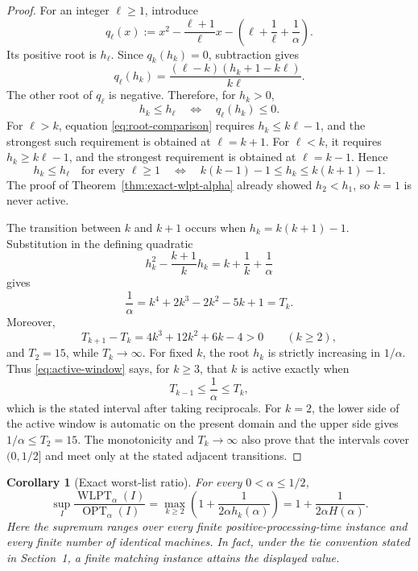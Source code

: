 \documentclass[11pt]{article}
\newtheorem{corollary}[theorem]{Corollary}
\theoremstyle{remark}
\newcommand{\OPT}{\operatorname{OPT}}
\newcommand{\WLPT}{\operatorname{WLPT}}
\begin{document}
\begin{proof}
For an integer $\ell\geq1$, introduce
\[
 q_\ell(x):=
 x^2-\frac{\ell+1}{\ell}x
 -\left(\ell+\frac1\ell+\frac1\alpha\right).
\]
Its positive root is $h_\ell$.  Since $q_k(h_k)=0$, subtraction gives
\begin{equation}
 q_\ell(h_k)
 =\frac{(\ell-k)(h_k+1-k\ell)}{k\ell}.
 \label{eq:root-comparison}
\end{equation}
The other root of $q_\ell$ is negative.  Therefore, for $h_k>0$,
\[
 h_k\leq h_\ell
 \quad\Longleftrightarrow\quad
 q_\ell(h_k)\leq0.
\]
For $\ell>k$, equation \eqref{eq:root-comparison} requires
$h_k\leq k\ell-1$, and the strongest such requirement is obtained at
$\ell=k+1$.  For $\ell<k$, it requires
$h_k\geq k\ell-1$, and the strongest requirement is obtained at
$\ell=k-1$.  Hence
\begin{equation}
 h_k\leq h_\ell\quad\text{for every $\ell\geq1$}
 \quad\Longleftrightarrow\quad
 k(k-1)-1\leq h_k\leq k(k+1)-1.
 \label{eq:active-window}
\end{equation}
The proof of Theorem~\ref{thm:exact-wlpt-alpha} already showed
$h_2<h_1$, so $k=1$ is never active.

The transition between $k$ and $k+1$ occurs when
$h_k=k(k+1)-1$.  Substitution in the defining quadratic
\[
 h_k^2-\frac{k+1}{k}h_k
 =k+\frac1k+\frac1\alpha
\]
gives
\[
 \frac1\alpha
 =k^4+2k^3-2k^2-5k+1=T_k.
\]
Moreover,
\[
 T_{k+1}-T_k=4k^3+12k^2+6k-4>0
 \qquad(k\geq2),
\]
and $T_2=15$, while $T_k\to\infty$.  For fixed $k$, the root $h_k$
is strictly increasing in $1/\alpha$.  Thus
\eqref{eq:active-window} says, for $k\geq3$, that $k$ is active
exactly when
\[
 T_{k-1}\leq\frac1\alpha\leq T_k,
\]
which is the stated interval after taking reciprocals.  For $k=2$, the
lower side of the active window is automatic on the present domain and
the upper side gives $1/\alpha\leq T_2=15$.  The monotonicity and
$T_k\to\infty$ also prove that the intervals cover
$(0,1/2]$ and meet only at the stated adjacent transitions.
\end{proof}

\begin{corollary}[Exact worst-list ratio]
\label{cor:exact-ratio}
For every $0<\alpha\leq1/2$,
\[
\boxed{\;
\sup_I\frac{\WLPT_\alpha(I)}{\OPT_\alpha(I)}
 =\max_{k\geq2}\left(1+\frac1{2\alpha h_k(\alpha)}\right)
 =1+\frac1{2\alpha H(\alpha)}.
\;}
\]
Here the supremum ranges over every finite positive-processing-time
instance and every finite number of identical machines.
In fact, under the tie convention stated in Section~1, a finite
matching instance attains the displayed value.
\end{corollary}
\end{document}
